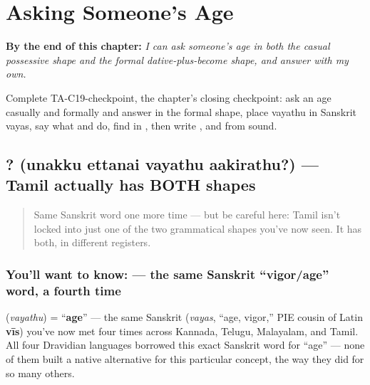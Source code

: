 
\chapter{Asking Someone's Age}
\label{ch:ta-asking-age}

\begin{chapteropening}
\textbf{By the end of this chapter:} \emph{I can ask someone's age in both the casual possessive shape and the formal dative-plus-become shape, and answer with my own.}

Complete TA-C19-checkpoint, the chapter's closing checkpoint: ask an age casually and formally and answer in the formal shape, place vayathu in Sanskrit vayas, say what  and  do, find  in , then write ,  and  from sound.
\end{chapteropening}

\section[\texorpdfstring{\ta{உனக்கு} \ta{எத்தனை} \ta{வயது} … (unakku ettanai …)}{உனக்கு எத்தனை வயது … (unakku ettanai …)}]{   ? (unakku ettanai vayathu aakirathu?) — Tamil actually has BOTH shapes}

\label{lesson:TA-C19-vayathu}



\begin{quote}
Same Sanskrit word one more time — but be careful here: Tamil isn't locked into just one of the two grammatical shapes you've now seen. It has both, in different registers.
\end{quote}

\subsection*{You'll want to know:  — the same Sanskrit \textquotedblleft{}vigor/age\textquotedblright{} word, a fourth time}
\textbf{} (\emph{vayathu}) = \textquotedblleft{}\textbf{age}\textquotedblright{} — the same Sanskrit \textbf{} (\emph{vayas}, \textquotedblleft{}age, vigor,\textquotedblright{} PIE cousin of Latin \textbf{vīs}) you've now met four times across Kannada, Telugu, Malayalam, and Tamil. All four Dravidian languages borrowed this exact Sanskrit word for \textquotedblleft{}age\textquotedblright{} — none of them built a native alternative for this particular concept, the way they did for so many others.

